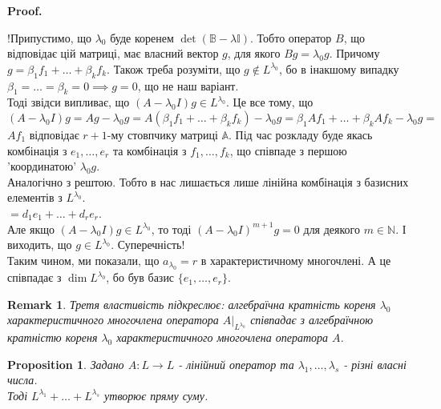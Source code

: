 \documentclass[a4paper, 10pt]{article}
\makeatletter
\theoremstyle{theoremdd}
\newtheorem{proposition}[theorem]{Proposition}
\newtheorem{remark}[theorem]{Remark}
\renewenvironment{proof}[1][Proof.\\]{\par
\pushQED{\hfill \qed}%
\normalfont \topsep6\p@\@plus6\p@\relax
\trivlist
\item\relax
{\bfseries
#1\@addpunct{.}}\hspace\labelsep\ignorespaces
}{%
\popQED\endtrivlist\@endpefalse
}
\makeatother
\begin{document}
\begin{proof}
!Припустимо, що $\lambda_0$ буде коренем $\det (\mathbb{B}-\lambda \mathbb{I})$. Тобто оператор $B$, що відповідає цій матриці, має власний вектор $g$, для якого $Bg = \lambda_0 g$. Причому $g = \beta_1 f_1 + \dots + \beta_k f_k$. Також треба розуміти, що $g \notin L^{\lambda_0}$, бо в інакшому випадку $\beta_1=\dots=\beta_k = 0 \implies g = 0$, що не наш варіант.\\
Тоді звідси випливає, що $(A-\lambda_0 I)g \in L^{\lambda_0}$. Це все тому, що\\
$(A-\lambda_0 I)g = Ag - \lambda_0 g = A(\beta_1 f_1 + \dots + \beta_k f_k) - \lambda_0 g = \beta_1 A f_1 + \dots + \beta_k A f_k - \lambda_0 g \boxed{=}$\\
$Af_1$ відповідає $r+1$-му стовпчику матриці $\mathbb{A}$. Під час розкладу буде якась комбінація з $e_1,\dots,e_r$ та комбінація з $f_1,\dots,f_k$, що співпаде з першою 'координатою' $\lambda_0 g$.\\
Аналогічно з рештою. Тобто в нас лишається лише лінійна комбінація з базисних елементів з $L^{\lambda_0}$.\\
$\boxed{=} d_1 e_1 + \dots + d_r e_r$.\\
Але якщо $(A-\lambda_0 I)g \in L^{\lambda_0}$, то тоді $(A-\lambda_0 I)^{m+1} g = 0$ для деякого $m \in \mathbb{N}$. І виходить, що $g \in L^{\lambda_0}$. Суперечність!\\
Таким чином, ми показали, що $a_{\lambda_0} = r$ в характеристичному многочлені. А це співпадає з $\dim L^{\lambda_0}$, бо був базис $\{e_1,\dots,e_r\}$.
\end{proof}

\begin{remark}
Третя властивість підкреслює: алгебраїчна кратність кореня $\lambda_0$ характеристичного многочлена оператора $A|_{L^{\lambda_0}}$ співпадає з алгебраїчною кратністю кореня $\lambda_0$ характеристичного многочлена оператора $A$.
\end{remark}

\begin{proposition}
Задано $A \colon L \to L$ - лінійний оператор та $\lambda_1,\dots,\lambda_s$ - різні власні числа.\\
Тоді $L^{\lambda_1}+\dots +L^{\lambda_s}$ утворює пряму суму.
\end{proposition}
\end{document}
